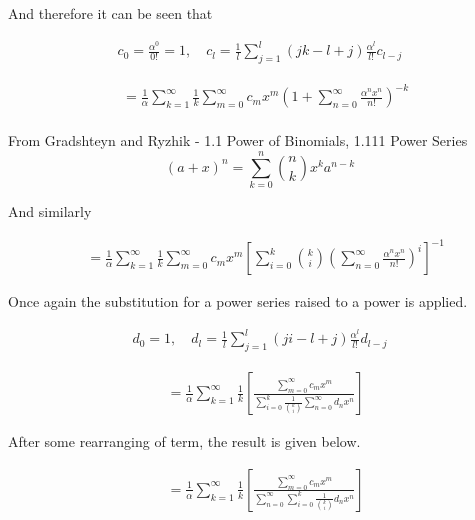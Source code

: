 And therefore it can be seen that

\begin{align*}
	c_{0} = \frac{\alpha^{0}}{0!}=1, \quad c_{l} = \frac{1}{l}\sum\limits_{j=1}^{l}(jk-l+j)\frac{\alpha^{l}}{l!}c_{l-j}
\end{align*}

\begin{align*}
	& = \frac{1}{\alpha}\sum\limits_{k=1}^{\infty}\frac{1}{k}\sum\limits_{m=0}^{\infty}c_{m}x^{m}\left( 1+\sum\limits_{n=0}^{\infty}\frac{\alpha^{n}x^{n}}{n!}\right)^{-k} \\
\end{align*}

From Gradshteyn and Ryzhik - 1.1 Power of Binomials, 1.111 Power Series
\begin{equation}
	(a+x)^n = \sum\limits_{k=0}^{n}{n \choose k}x^k a^{n-k}
\end{equation}

And similarly

\begin{align*}
	& = \frac{1}{\alpha}\sum\limits_{k=1}^{\infty}\frac{1}{k}\sum\limits_{m=0}^{\infty}c_mx^m
	\left[ \sum\limits_{i=0}^{k}{k \choose i} \left( \sum\limits_{n=0}^{\infty}\frac{\alpha^nx^n}{n!} \right)^{i} \right]^{-1}
\end{align*}

Once again the substitution for a power series raised to a power is applied.

\begin{align*}
	d_{0} = 1, \quad d_{l}=\frac{1}{l}\sum\limits_{j=1}^{l}(ji-l+j)\frac{\alpha^{l}}{l!}d_{l-j}
\end{align*}

\begin{align*}
	& = \frac{1}{\alpha}\sum\limits_{k=1}^{\infty}\frac{1}{k}\left[ \frac{\sum\limits_{m=0}^{\infty}c_{m}x^{m}}{\sum\limits_{i=0}^{k}\frac{1}{{k \choose i}}\sum\limits_{n=0}^{\infty}d_{n}x^{n}} \right]
\end{align*}

After some rearranging of term, the result is given below.

\begin{align*}
	& = \frac{1}{\alpha}\sum\limits_{k=1}^{\infty}\frac{1}{k}\left[ \frac{\sum\limits_{m=0}^{\infty}c_{m}x^{m}}{\sum\limits_{n=0}^{\infty}\sum\limits_{i=0}^{k}\frac{1}{{k \choose i}}d_{n}x^{n}} \right] \\
\end{align*}

